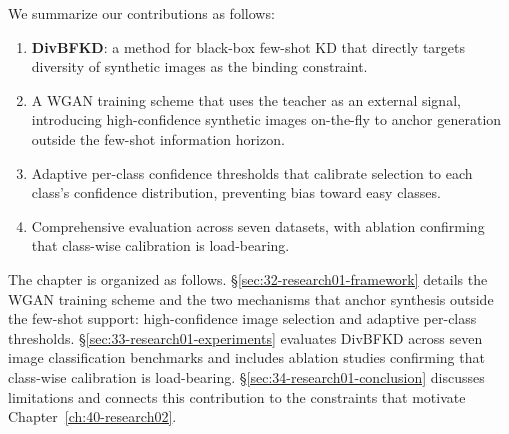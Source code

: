\begin{foldable}
  We summarize our contributions as follows:
  \begin{enumerate}
    \item \textbf{DivBFKD}: a method for black-box few-shot \ac{KD} that directly targets diversity of synthetic images as the binding constraint.
    \item A WGAN training scheme that uses the teacher as an external signal, introducing high-confidence synthetic images on-the-fly to anchor generation outside the few-shot information horizon.
    \item Adaptive per-class confidence thresholds that calibrate selection to each class's confidence distribution, preventing bias toward easy classes.
    \item Comprehensive evaluation across seven datasets, with ablation confirming that class-wise calibration is load-bearing.
  \end{enumerate}
\end{foldable}

\begin{foldable}
  The chapter is organized as follows.
  \S\ref{sec:32-research01-framework} details the WGAN training scheme and the two mechanisms that anchor synthesis outside the few-shot support: high-confidence image selection and adaptive per-class thresholds.
  \S\ref{sec:33-research01-experiments} evaluates DivBFKD across seven image classification benchmarks and includes ablation studies confirming that class-wise calibration is load-bearing.
  \S\ref{sec:34-research01-conclusion} discusses limitations and connects this contribution to the constraints that motivate Chapter~\ref{ch:40-research02}.
\end{foldable}
